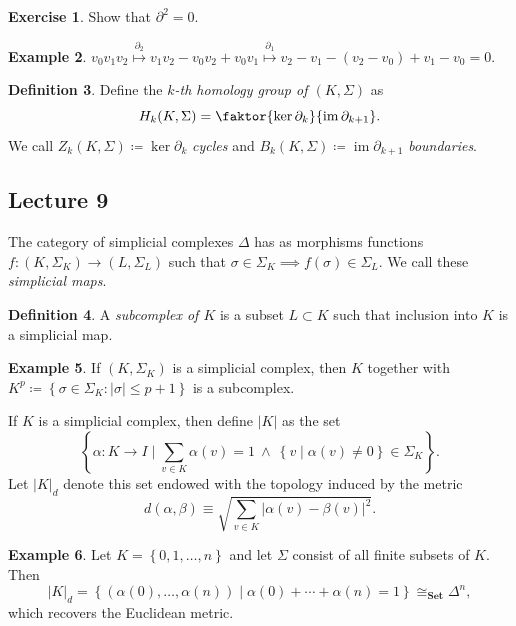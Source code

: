 \documentclass[10pt,letterpaper,cm]{nupset}
\theoremstyle{definition}
\newtheorem{definition}{Definition}[subsection]
\newtheorem{exmp}[definition]{Example}
\theoremstyle{theorem}
\newtheorem{exercise}[definition]{Exercise}
\theoremstyle{remark}
\newcommand{\1}{\mathbb{1}}
\newcommand{\0}{\vec 0}
\DeclareMathOperator{\im}{im}
\begin{document}
\begin{exercise}
Show that $\partial^2 =0$.
\end{exercise}

\begin{exmp}
$v_0v_1v_2 \overset{\partial_2}{\longmapsto}  v_1 v_2 - v_0v_2 + v_0v_1  \overset{\partial_1}{\longmapsto} v_2 - v_1 -\left(v_2 - v_0\right) + v_1 - v_0 =0 .$
\end{exmp}

\begin{definition}
Define the \textit{$k$-th homology group of $\left(K , \Sigma\right)$} as $$H_k(K, \Sigma) = \faktor{\ker{\partial_k}}{\im{\partial_{k+1}}}.$$ We call $Z_k(K, \Sigma)\coloneqq  \ker{\partial_k}$ \textit{cycles} and $B_k(K, \Sigma)\coloneqq  \im{\partial_{k+1}}$ \textit{boundaries}.
\end{definition}

\subsection{Lecture 9}


The category of simplicial complexes $\Delta$ has as morphisms functions $f: \left(K, \Sigma_K\right) \to \left(L, \Sigma_L\right)$ such that $\sigma \in \Sigma_K \implies f(\sigma) \in \Sigma_L$. We call these \textit{simplicial maps}.


\begin{definition}
A \textit{subcomplex of $K$} is a subset $L \subset K$ such that inclusion into $K$ is a simplicial map.
\end{definition}

\begin{exmp}
If $\left(K, \Sigma_K\right)$ is a simplicial complex, then $K$ together with $K^p \coloneqq   \left\{\sigma \in \Sigma_K : \left\lvert{\sigma}\right\rvert \leq p+1\right\}$ is a subcomplex.
\end{exmp}

\smallskip

If $K$ is a simplicial complex, then define $\left\lvert{K}\right\rvert$ as the set $$\left\{\alpha : K \to I \mid \sum_{v\in K} \alpha(v)=1 \ \land \ \left\{v \mid \alpha(v) \ne 0\right\} \in \Sigma_K\right\}.$$ Let $\left\lvert{K}\right\rvert_d$ denote this set endowed with the topology induced by the metric  $$d(\alpha, \beta) \equiv \sqrt{\sum_{v\in K} \left\lvert{\alpha(v) -\beta(v)}\right\rvert^2} .$$


\begin{exmp}
Let  $K= \left\{0, 1, \ldots, n\right\}$ and let $\Sigma$ consist of all finite subsets of $K$. Then $$\left\lvert{K}\right\rvert_d = \left\{ \left(\alpha(0), \ldots, \alpha(n)\right) \mid \alpha(0) + \cdots + \alpha(n) = 1\right\} \cong_{\mathbf{Set}} \Delta^n,$$ which recovers the Euclidean metric. 
\end{exmp}
\end{document}
